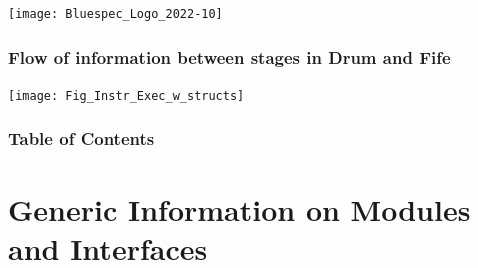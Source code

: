 


\date{L7: BSV: Modules and Interfaces}





\begin{frame}
 \titlepage

 \begin{center}
  \texttt{[image: Bluespec\_Logo\_2022-10]}
 \end{center}

\end{frame}





\begin{frame}
\frametitle{Flow of information between stages in Drum and Fife}

\footnotesize

\begin{center}
\texttt{[image: Fig\_Instr\_Exec\_w\_structs]}
\end{center}

\end{frame}


\begin{frame}
\frametitle{Table of Contents}

\tableofcontents

\end{frame}


\section{Generic Information on Modules and Interfaces}


